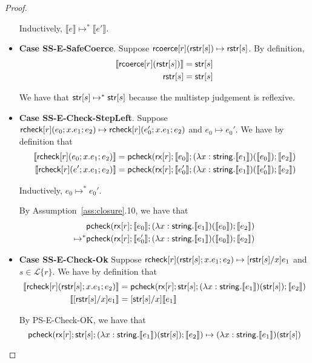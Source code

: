 \documentclass[11pt,leqno]{article}
\theoremstyle{definition}
\newcommand{\Lagr}{\mathcal{L}}
\newcommand{\lang}[1]{\Lagr\{#1\}}
\newcommand{\rcoerce}[2]{{\sf rcoerce}[#1](#2)}
\newcommand{\rcheck}[4]{ {\sf rcheck}[#1](#2;#3;#4) }
\newcommand{\tcheck}[4]{{\sf pcheck}(#1; #2; #3; #4)}
\renewcommand{\tstr}[1]{{{\sf str}[#1]}}
\newcommand{\rx}[1]{ {\sf rx}[#1] }
\newcommand{\str}{{\sf string}}
\newcommand{\trden}[1]{\llbracket #1 \rrbracket} %
\begin{document}
\begin{proof}
\begin{itemize}[label=$ $,itemsep=1ex]
Inductively, $\trden{e} \mapsto^* \trden{e'}$.

\item\textbf{Case SS-E-SafeCoerce}. 
Suppose $\rcoerce{r}{\rstr{s}} \mapsto \rstr{s}$.
By definition, 
\begin{align*}
\trden{\rcoerce{r}{\rstr{s}}} &= \tstr{s} \\
\rstr{s} &= \tstr{s}
\end{align*}

We have that $\tstr{s} \mapsto^* \tstr{s}$ because the multistep judgement is reflexive.

\item\textbf{Case SS-E-Check-StepLeft}. 
Suppose $\rcheck{r}{e_0}{x.e_1}{e_2} \mapsto \rcheck{r}{e_0'}{x.e_1}{e_2}$
and $e_0 \mapsto e_0'$. We have by definition that 
\begin{align*}
\trden{\rcheck{r}{e_0}{x.e_1}{e_2}} &= \tcheck{\rx{r}}{\trden{e_0}}{(\lambda x : \str. \trden{e_1})(\trden{e_0})}{\trden{e_2}} \\
\trden{\rcheck{r}{e'}{x.e_1}{e_2}} &= \tcheck{\rx{r}}{\trden{e_0'}}{(\lambda x : \str. \trden{e_1})(\trden{e_0'})}{\trden{e_2}}
\end{align*}

Inductively, $e_0 \mapsto^* e_0'$.

By Assumption~\ref{ass:closure}.10, we have that 
\begin{align*}
    & \tcheck{\rx{r}}{\trden{e_0}}{(\lambda x : \str. \trden{e_1})(\trden{e_0})}{\trden{e_2}}\\
    \mapsto^* & \tcheck{\rx{r}}{\trden{e_0'}}{(\lambda x : \str. \trden{e_1})(\trden{e_0})}{\trden{e_2}}
\end{align*}


\item \textbf{Case SS-E-Check-Ok}
Suppose $\rcheck{r}{\rstr{s}}{x.e_1}{e_2} \mapsto [\rstr{s} / x]e_1$ and $s \in \lang{r}$.
We have by definition that 
\begin{align*}
\trden{\rcheck{r}{\rstr{s}}{x.e_1}{e_2}} &= \tcheck{\rx{r}}{\tstr{s}}{(\lambda x : \str.\trden{e_1})(\tstr{s})}{\trden{e_2}} \\
\trden{ [\rstr{s} / x] e_1 } &= [ \tstr{s} / x ] \trden{e_1}
\end{align*}

By PS-E-Check-OK, we have that 
$$\tcheck{\rx{r}}{\tstr{s}}{(\lambda x : \str.\trden{e_1})(\tstr{s})}{\trden{e_2}} \mapsto (\lambda x : \str.\trden{e_1})(\tstr{s})$$


\end{itemize}
\end{proof}
\end{document}
